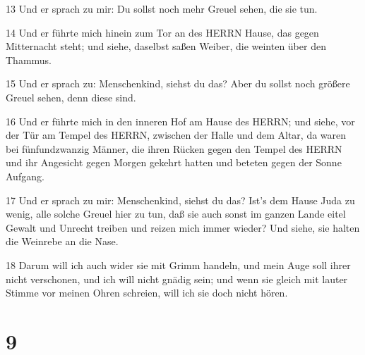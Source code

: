 \par 13 Und er sprach zu mir: Du sollst noch mehr Greuel sehen, die sie tun.
\par 14 Und er führte mich hinein zum Tor an des HERRN Hause, das gegen Mitternacht steht; und siehe, daselbst saßen Weiber, die weinten über den Thammus.
\par 15 Und er sprach zu: Menschenkind, siehst du das? Aber du sollst noch größere Greuel sehen, denn diese sind.
\par 16 Und er führte mich in den inneren Hof am Hause des HERRN; und siehe, vor der Tür am Tempel des HERRN, zwischen der Halle und dem Altar, da waren bei fünfundzwanzig Männer, die ihren Rücken gegen den Tempel des HERRN und ihr Angesicht gegen Morgen gekehrt hatten und beteten gegen der Sonne Aufgang.
\par 17 Und er sprach zu mir: Menschenkind, siehst du das? Ist's dem Hause Juda zu wenig, alle solche Greuel hier zu tun, daß sie auch sonst im ganzen Lande eitel Gewalt und Unrecht treiben und reizen mich immer wieder? Und siehe, sie halten die Weinrebe an die Nase.
\par 18 Darum will ich auch wider sie mit Grimm handeln, und mein Auge soll ihrer nicht verschonen, und ich will nicht gnädig sein; und wenn sie gleich mit lauter Stimme vor meinen Ohren schreien, will ich sie doch nicht hören.

\chapter{9}

